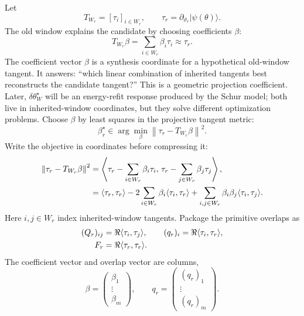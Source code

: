 \documentclass[10pt,twocolumn]{article}
\newcommand{\ket}[1]{\lvert #1\rangle}
\begin{document}
Let
\begin{equation}
T_{W_r}=[\tau_i]_{i\in W_r},
\qquad
\tau_r=\partial_{\vartheta_r}\ket{\psi(\theta)}.
\label{eq:p1_window_candidate}
\end{equation}
The old window explains the candidate by choosing coefficients \(\beta\):
\begin{equation}
T_{W_r}\beta=\sum_{i\in W_r}\beta_i\tau_i\approx \tau_r.
\label{eq:p1_synthesis}
\end{equation}
The coefficient vector \(\beta\) is a synthesis coordinate for a hypothetical old-window tangent. It answers: ``which linear combination of inherited tangents best reconstructs the candidate tangent?'' This is a geometric projection coefficient. Later, \(\delta\theta_W^\star\) will be an energy-refit response produced by the Schur model; both live in inherited-window coordinates, but they solve different optimization problems.
Choose \(\beta\) by least squares in the projective tangent metric:
\begin{equation}
\beta_r^\star\in\arg\min_\beta
\left\|\tau_r-T_{W_r}\beta\right\|^2.
\label{eq:p1_ls}
\end{equation}
Write the objective in coordinates before compressing it:
\begin{align}
\left\|\tau_r-T_{W_r}\beta\right\|^2
&=\left\langle
\tau_r-\sum_{i\in W_r}\beta_i\tau_i,\,
\tau_r-\sum_{j\in W_r}\beta_j\tau_j
\right\rangle,
\notag\\
&=\langle\tau_r,\tau_r\rangle
-2\sum_{i\in W_r}\beta_i\langle\tau_i,\tau_r\rangle
+\sum_{i,j\in W_r}\beta_i\beta_j\langle\tau_i,\tau_j\rangle.
\label{eq:p1_coordinate_expand}
\end{align}
Here \(i,j\in W_r\) index inherited-window tangents. Package the primitive overlaps as
\begin{align}
(Q_r)_{ij}&=\Re\langle\tau_i,\tau_j\rangle,
\qquad
(q_r)_i=\Re\langle\tau_i,\tau_r\rangle,
\notag\\
F_r&=\Re\langle\tau_r,\tau_r\rangle.
\label{eq:p1_QqF}
\end{align}
The coefficient vector and overlap vector are columns,
\begin{equation}
\beta=
\begin{pmatrix}
\beta_1\\[-1mm]\vdots\\[-1mm]\beta_m
\end{pmatrix},
\qquad
q_r=
\begin{pmatrix}
(q_r)_1\\[-1mm]\vdots\\[-1mm](q_r)_m
\end{pmatrix}.
\label{eq:p1_column_vectors}
\end{equation}
\end{document}

